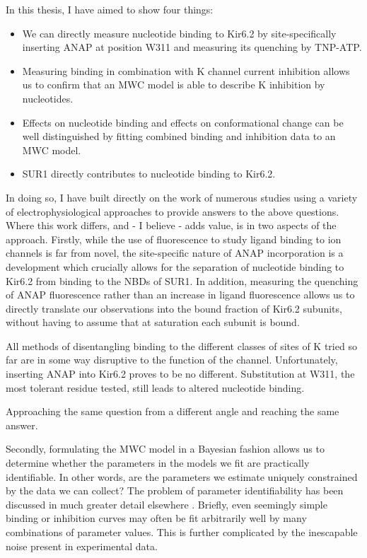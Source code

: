 In this thesis, I have aimed to show four things:
\begin{itemize}
\item We can directly measure nucleotide binding to Kir6.2 by site-specifically inserting ANAP at position W311 and measuring its quenching by TNP-ATP.
\item Measuring binding in combination with K\ATP{} channel current inhibition allows us to confirm that an MWC model is able to describe K\ATP{} inhibition by nucleotides.
\item Effects on nucleotide binding and effects on conformational change can be well distinguished by fitting combined binding and inhibition data to an MWC model.
\item SUR1 directly contributes to nucleotide binding to Kir6.2.
\end{itemize}

In doing so, I have built directly on the work of numerous studies using a variety of electrophysiological approaches to provide answers to the above questions.
Where this work differs, and - I believe - adds value, is in two aspects of the approach.
Firstly, while the use of fluorescence to study ligand binding to ion channels is far from novel, the site-specific nature of ANAP incorporation is a development which crucially allows for the separation of nucleotide binding to Kir6.2 from binding to the NBDs of SUR1.
In addition, measuring the quenching of ANAP fluorescence rather than an increase in ligand fluorescence allows us to directly translate our observations into the bound fraction of Kir6.2 subunits, without having to assume that at saturation each subunit is bound.

All methods of disentangling binding to the different classes of sites of K\ATP{} tried so far are in some way disruptive to the function of the channel.
Unfortunately, inserting ANAP into Kir6.2 proves to be no different. 
Substitution at W311, the most tolerant residue tested, still leads to altered nucleotide binding.

Approaching the same question from a different angle and reaching the same answer.

Secondly, formulating the MWC model in a Bayesian fashion allows us to determine whether the parameters in the models we fit are practically identifiable.
In other words, are the parameters we estimate uniquely constrained by the data we can collect?
The problem of parameter identifiability has been discussed in much greater detail elsewhere \cite{calderhead_bayesian_2013, hines_determination_2014-1, hines_primer_2015, middendorf_structural_2016}.
Briefly, even seemingly simple binding or inhibition curves may often be fit arbitrarily well by many combinations of parameter values.
This is further complicated by the inescapable noise present in experimental data.

